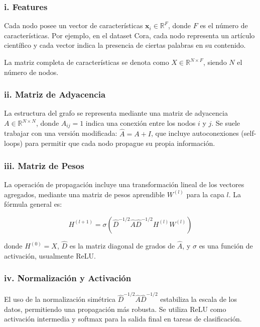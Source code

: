 \documentclass[11pt]{article} %
\begin{document}
\subsubsection{i. Features}

Cada nodo posee un vector de características $\mathbf{x}_i \in \mathbb{R}^F$, donde $F$ es el número de características. Por ejemplo, en el dataset Cora, cada nodo representa un artículo científico y cada vector indica la presencia de ciertas palabras en su contenido.

La matriz completa de características se denota como $X \in \mathbb{R}^{N \times F}$, siendo $N$ el número de nodos.

\subsubsection{ii. Matriz de Adyacencia}

La estructura del grafo se representa mediante una matriz de adyacencia $A \in \mathbb{R}^{N \times N}$, donde $A_{ij} = 1$ indica una conexión entre los nodos $i$ y $j$. Se suele trabajar con una versión modificada: $\hat{A} = A + I$, que incluye autoconexiones (self-loops) para permitir que cada nodo propague su propia información.

\subsubsection{iii. Matriz de Pesos}

La operación de propagación incluye una transformación lineal de los vectores agregados, mediante una matriz de pesos aprendible $W^{(l)}$ para la capa $l$. La fórmula general es:

\[
H^{(l+1)} = \sigma\left( \hat{D}^{-1/2} \hat{A} \hat{D}^{-1/2} H^{(l)} W^{(l)} \right)
\]

donde $H^{(0)} = X$, $\hat{D}$ es la matriz diagonal de grados de $\hat{A}$, y $\sigma$ es una función de activación, usualmente ReLU.

\subsubsection{iv. Normalización y Activación}

El uso de la normalización simétrica $\hat{D}^{-1/2} \hat{A} \hat{D}^{-1/2}$ estabiliza la escala de los datos, permitiendo una propagación más robusta. Se utiliza ReLU como activación intermedia y softmax para la salida final en tareas de clasificación.
\end{document}
